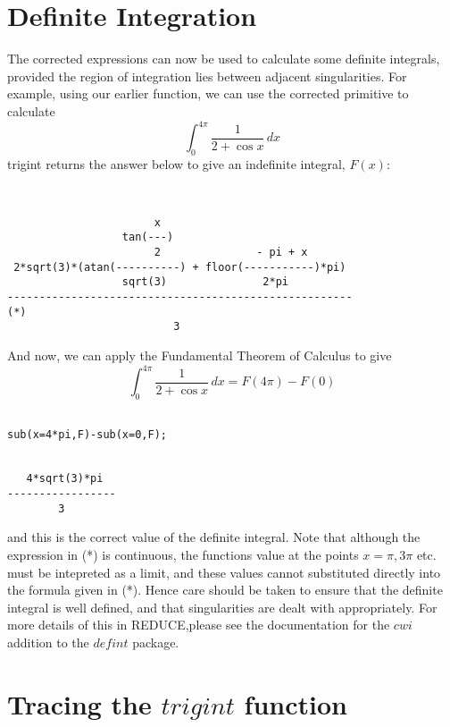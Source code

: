 \section{Definite Integration}
The corrected expressions can now be used to calculate some definite integrals, provided the region of integration lies between adjacent singularities. For example, using our earlier function, we can use the corrected primitive to calculate  
     \begin{equation} \int_{0}^{4\pi} \frac{1}{2+\cos x}\,dx \end{equation}
trigint returns the answer below to give an indefinite integral, $F(x)$:
\begin{verbatim}
        

                       x
                  tan(---)
                       2               - pi + x
 2*sqrt(3)*(atan(----------) + floor(-----------)*pi)
                  sqrt(3)               2*pi
------------------------------------------------------                   (*) 
                          3

\end{verbatim}
And now, we can apply the Fundamental Theorem of Calculus to give
 \begin{equation} \int_{0}^{4\pi} \frac{1}{2+\cos x}\,dx = F(4\pi)-F(0) \end{equation}
\begin{verbatim}

sub(x=4*pi,F)-sub(x=0,F);


   4*sqrt(3)*pi
-----------------
        3

\end{verbatim}
and this is the correct value of the definite integral.
Note that although the expression in (*) is continuous, the functions value at the points $x=\pi,3\pi$ etc. must be intepreted as a limit, and these values cannot substituted directly into the formula given in (*). Hence care should be taken to ensure that the definite integral is well defined, and that singularities are dealt with appropriately. For more details of this in \small{REDUCE},\normalsize please see the documentation for the $cwi$ addition to the $defint$ package.

\section{Tracing the $trigint$ function}

